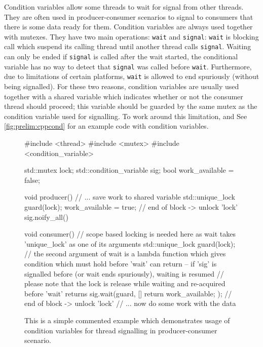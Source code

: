 Condition variables allow some threads to wait for signal from other threads.
They are often used in producer-consumer scenarios to signal to consumers that
there is some data ready for them.
Condition variables are always used together with mutexes.
They have two main operations: \texttt{wait} and \texttt{signal}: \texttt{wait}
is blocking call which suspend its calling thread until another thread calls
\texttt{signal}.
Waiting can only be ended if \texttt{signal} is called after the wait started,
the conditional variable has no way to detect that \texttt{signal} was called
before \texttt{wait}.
Furthermore, due to limitations of certain platforms, \texttt{wait} is allowed
to end spuriously (without being signalled).
For these two reasons, condition variables are usually used together with a
shared variable which indicates whether or not the consumer thread should
proceed; this variable should be guarded by the same mutex as the condition
variable used for signalling.
To work around this limitation, and 
See \autoref{fig:prelim:cppcond} for an example code with condition variables.

\begin{figure}[tp]
    \begin{cppcode}
        #include <thread>
        #include <mutex>
        #include <condition_variable>

        std::mutex lock;
        std::condition_variable sig;
        bool work_available = false;

        void producer() {
            // ... save work to shared variable
            {
                std::unique_lock guard(lock);
                work_available = true;
            } // end of block -> unlock 'lock'
            sig.noify_all()
        }

        void consumer() {
            {
                // scope based locking is needed here as wait takes 'unique_lock' as one of its arguments
                std::unique_lock guard(lock);
                // the second argument of wait is a lambda function which gives condition which must hold before 'wait' can return -- if 'sig' is signalled before (or wait ends spuriously), waiting is resumed
                // please note that the lock is release while waiting and re-acquired before 'wait' returns
                sig.wait(guard, []{ return work_available; });
            } // end of block -> unlock 'lock'
            // ... now do some work with the data
        }
    \end{cppcode}
    \caption{This is a simple commented example which demonstrates usage of
    condition variables for thread signalling in producer-consumer scenario.
    }\label{fig:prelim:cppcond}
\end{figure}

